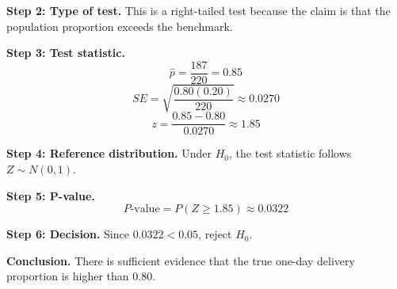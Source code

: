 \begin{ExamProblems}
\textbf{Step 2: Type of test.} This is a right-tailed test because the claim is that the population proportion exceeds the benchmark.

\textbf{Step 3: Test statistic.}
\[
\hat{p}=\frac{187}{220}=0.85
\]
\[
SE=\sqrt{\frac{0.80(0.20)}{220}}\approx 0.0270
\]
\[
z=\frac{0.85-0.80}{0.0270}\approx 1.85
\]

\textbf{Step 4: Reference distribution.} Under \(H_0\), the test statistic follows \(Z\sim N(0,1)\).

\textbf{Step 5: P-value.}
\[
P\text{-value}=P(Z\ge 1.85)\approx 0.0322
\]

\textbf{Step 6: Decision.} Since \(0.0322<0.05\), reject \(H_0\).

\textbf{Conclusion.} There is sufficient evidence that the true one-day delivery proportion is higher than 0.80.

\end{ExamProblems}

